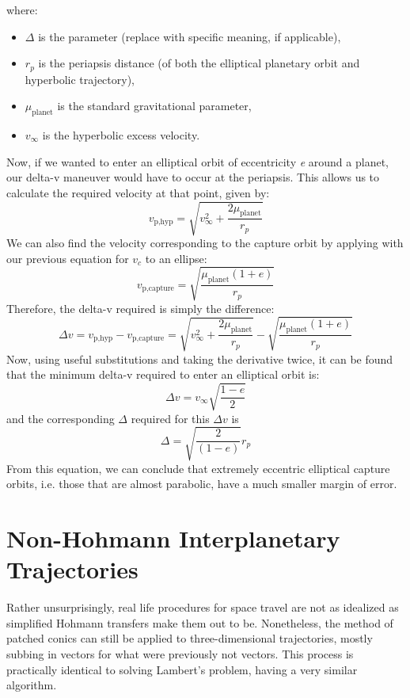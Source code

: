 \documentclass{article}
\numberwithin{figure}{section}
\begin{document}
where:
\begin{itemize}
    \item \(\Delta\) is the parameter (replace with specific meaning, if applicable),
    \item \(r_p\) is the periapsis distance (of both the elliptical planetary orbit and hyperbolic trajectory),
    \item \(\mu_\text{planet}\) is the standard gravitational parameter,
    \item \(v_\infty\) is the hyperbolic excess velocity.
\end{itemize}
Now, if we wanted to enter an elliptical orbit of eccentricity \textit{e} around a planet, our delta-v maneuver would have to occur at the periapsis. This allows us to calculate the required velocity at that point, given by:
\[
v_{\text{p,hyp}} = \sqrt{v_\infty^2 + \frac{2\mu_\text{planet}}{r_p}}
\]
We can also find the velocity corresponding to the capture orbit by applying with our previous equation for \(v_c\) to an ellipse:
\[
v_{\text{p,capture}} = \sqrt{\frac{\mu_\text{planet}(1 + e)}{r_p}}
\]
Therefore, the delta-v required is simply the difference:
\[
\Delta v = v_{\text{p,hyp}} - v_{\text{p,capture}} = \sqrt{v_\infty^2 + \frac{2\mu_\text{planet}}{r_p}} - \sqrt{\frac{\mu_\text{planet}(1 + e)}{r_p}}
\]
Now, using useful substitutions and taking the derivative twice, it can be found that the minimum delta-v required to enter an elliptical orbit is:
\[
\Delta v = v_\infty \sqrt{\frac{1 - e}{2}}
\]
and the corresponding \(\Delta\) required for this \(\Delta v\) is
\[
\Delta = \sqrt{\frac{2}{(1 - e)}}{r_p}
\]
From this equation, we can conclude that extremely eccentric elliptical capture orbits, i.e. those that are almost parabolic, have a much smaller margin of error.
\section{Non-Hohmann Interplanetary Trajectories}

Rather unsurprisingly, real life procedures for space travel are not as idealized as simplified Hohmann transfers make them out to be. Nonetheless, the method of patched conics can still be applied to three-dimensional trajectories, mostly subbing in vectors for what were previously not vectors. This process is practically identical to solving Lambert's problem, having a very similar algorithm. 
\end{document}
